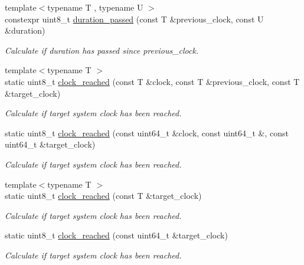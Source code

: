 \begin{DoxyCompactItemize}
{\footnotesize template$<$typename T , typename U $>$ }\\constexpr uint8\+\_\+t \hyperlink{namespaceclock_a4db26a90b5c001f2bb46af7a2069d63d}{duration\+\_\+passed} (const T \&previous\+\_\+clock, const U \&duration)
\begin{DoxyCompactList}\small\item\em Calculate if duration has passed since previous\+\_\+clock. \end{DoxyCompactList}\item 
{\footnotesize template$<$typename T $>$ }\\static uint8\+\_\+t \hyperlink{namespaceclock_a107ad02a77763be28bf63d43c566cf75}{clock\+\_\+reached} (const T \&clock, const T \&previous\+\_\+clock, const T \&target\+\_\+clock)
\begin{DoxyCompactList}\small\item\em Calculate if target system clock has been reached. \end{DoxyCompactList}\item 
static uint8\+\_\+t \hyperlink{namespaceclock_a9af9c9c3928a386721fa60473274f9f8}{clock\+\_\+reached} (const uint64\+\_\+t \&clock, const uint64\+\_\+t \&, const uint64\+\_\+t \&target\+\_\+clock)
\begin{DoxyCompactList}\small\item\em Calculate if target system clock has been reached. \end{DoxyCompactList}\item 
{\footnotesize template$<$typename T $>$ }\\static uint8\+\_\+t \hyperlink{namespaceclock_a240d81de9119f92701aa5f26555972c4}{clock\+\_\+reached} (const T \&target\+\_\+clock)
\begin{DoxyCompactList}\small\item\em Calculate if target system clock has been reached. \end{DoxyCompactList}\item 
static uint8\+\_\+t \hyperlink{namespaceclock_a48932048c086f3d07ef74d9194cbfe1d}{clock\+\_\+reached} (const uint64\+\_\+t \&target\+\_\+clock)
\begin{DoxyCompactList}\small\item\em Calculate if target system clock has been reached. \end{DoxyCompactList}\end{DoxyCompactItemize}
